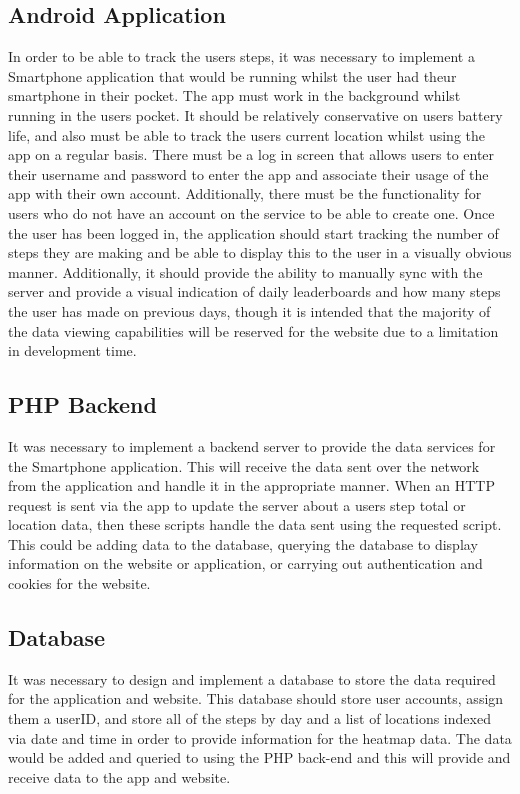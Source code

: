 \documentclass{l4proj}
\begin{document}
\subsection{Android Application}

In order to be able to track the users steps, it was necessary to implement a Smartphone application that would be running whilst the user had theur smartphone in their pocket. The app must work in the background whilst running in the users pocket. It should be relatively conservative on users battery life, and also must be able to track the users current location whilst using the app on a regular basis. There must be a log in screen that allows users to enter their username and password to enter the app and associate their usage of the app with their own account. Additionally, there must be the functionality for users who do not have an account on the service to be able to create one. Once the user has been logged in, the application should start tracking the number of steps they are making and be able to display this to the user in a visually obvious manner. Additionally, it should provide the ability to manually sync with the server and provide a visual indication of daily leaderboards and how many steps the user has made on previous days, though it is intended that the majority of the data viewing capabilities will be reserved for the website due to a limitation in development time.

\subsection{PHP Backend}

It was necessary to implement a backend server to provide the data services for the Smartphone application. This will receive the data sent over the network from the application and handle it in the appropriate manner. When an HTTP request is sent via the app to update the server about a users step total or location data, then these scripts handle the data sent using the requested script. This could be adding data to the database, querying the database to display information on the website or application, or carrying out authentication and cookies for the website.

\subsection{Database}

It was necessary to design and implement a database to store the data required for the application and website. This database should store user accounts, assign them a userID, and store all of the steps by day and a list of locations indexed via date and time in order to provide information for the heatmap data. The data would be added and queried to using the PHP back-end and this will provide and receive data to the app and website.
\end{document}
